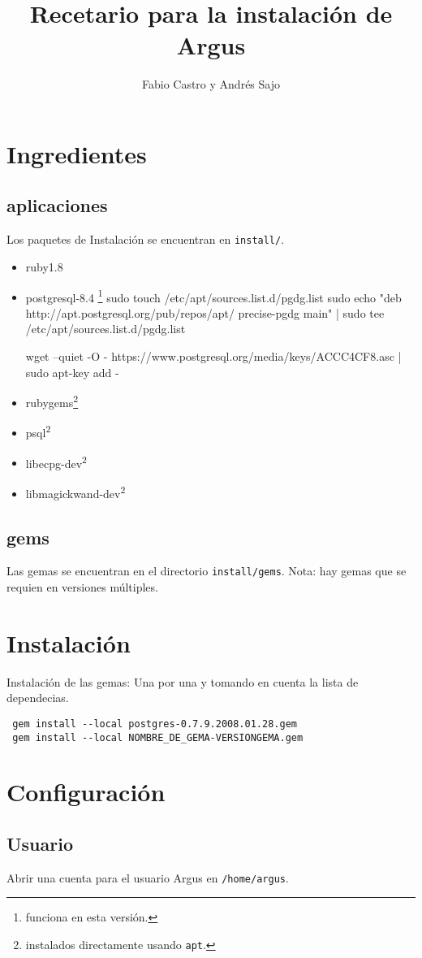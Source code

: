 \documentclass[spanish,10pt]{article}
\title{Recetario para la instalación de Argus}
\author{Fabio Castro y Andrés Sajo}
\begin{document}
\maketitle
\section{Ingredientes}
\subsection{aplicaciones}
Los paquetes de Instalación se encuentran en \texttt{install/}.
\begin{itemize}
\item[] ruby1.8
\item[] postgresql-8.4 \footnote{funciona en esta versión.} 
\subitem[] sudo touch /etc/apt/sources.list.d/pgdg.list
\subitem[] sudo echo "deb http://apt.postgresql.org/pub/repos/apt/ precise-pgdg main" | sudo tee /etc/apt/sources.list.d/pgdg.list

\subitem[] wget --quiet -O - https://www.postgresql.org/media/keys/ACCC4CF8.asc | sudo apt-key add -
\item[] rubygems\footnote[2]{instalados directamente usando \texttt{apt}.}
\item[] psql\textsuperscript{2}
\item[] libecpg-dev\textsuperscript{2}
\item[] libmagickwand-dev\textsuperscript{2}
\end{itemize}
\subsection{gems}
Las gemas se encuentran en el directorio \texttt{install/gems}. Nota: hay gemas que se requien en versiones múltiples.

\section{Instalación}
Instalación de las gemas: Una por una y tomando en cuenta la lista de dependecias.
\begin{verbatim}
 gem install --local postgres-0.7.9.2008.01.28.gem
 gem install --local NOMBRE_DE_GEMA-VERSIONGEMA.gem
\end{verbatim}

\section{Configuración}
\subsection{Usuario}
Abrir una cuenta para el usuario Argus en \texttt{/home/argus}.
\end{document}
